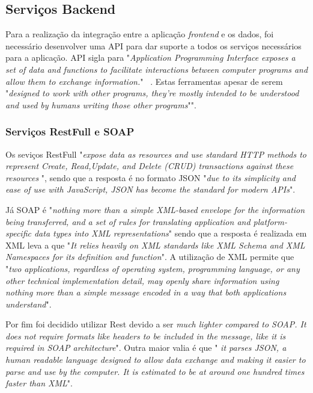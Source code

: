 \subsection{Serviços Backend}

Para a realização da integração entre a aplicação \emph{frontend} e os dados, foi necessário desenvolver uma API para dar suporte a todos os serviços necessários para a aplicação.
API sigla para "\emph{Application Programming Interface} \emph{exposes a set of data and functions to facilitate interactions between computer programs and allow them to exchange information.}" ~\citep{rest_cookbook}.
Estas ferramentas apesar de serem "\emph{designed  to  work  with  other  programs,  they’re  mostly intended to be understood and used by humans writing those other programs}"\citep{api_design}".

\newpage

\subsubsection{Serviços RestFull e SOAP}
Os seviços RestFull "\emph{expose data as resources  and  use  standard  HTTP  methods  to  represent  Create,  Read,Update,  and  Delete  (CRUD)  transactions  against  these  resources}
\citep{api_design}", sendo que a resposta é no formato JSON "\emph{due  to  its  simplicity  and  ease  of  use  with  JavaScript,  JSON  has become the standard for modern APIs}"\citep{api_design}.

Já SOAP é "\emph{nothing  more  than  a  simple  XML-based  envelope  for  the  information  being  transferred,  and  a  set  of  rules  for  translating  application and platform-specific data types into XML representations}"\citep{Snell2002} sendo que a resposta é realizada em XML leva a que "\emph{It relies heavily on XML  standards  like  XML  Schema  and  XML  Namespaces  for  its  definition  and  function}"\citep{Snell2002}. A utilização de XML permite que "\emph{two  applications,  regardless  of  operating  system,  programming  language,  or  any  other  technical  implementation  detail,  may  openly  share  information  using  nothing  more  than  a  simple  message  encoded  in  a  way  that  both  applications  understand}"\citep{Snell2002}.

Por fim foi decidido utilizar Rest devido a ser \emph{much lighter compared to SOAP. It does not require formats like headers to be included in the message, like it is required in SOAP architecture}". Outra maior valia é que "\emph{ it parses JSON, a human readable language designed to allow data exchange and making it easier to parse and use by the computer. It is estimated to be at around one hundred times faster than XML}"\citep{Halili2018}.


